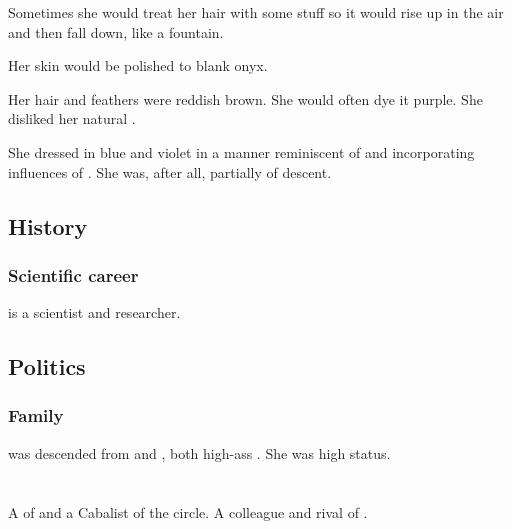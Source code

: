 Sometimes she would treat her hair with some stuff so it would rise up in the air and then fall down, like a fountain. 

Her skin would be polished to blank onyx. 

Her hair and feathers were reddish brown.
She would often dye it purple. 
She disliked her natural \colour. 

She dressed in blue and violet in a manner reminiscent of and incorporating influences of \TiphredSerah. 
She was, after all, partially of \TiphredSerah{} descent. 









\subsection{History}





\subsubsection{Scientific career}
\Firaxel{} is a scientist and researcher. 









\subsection{Politics}
\subsubsection{Family}
\Firaxel{} was descended from  and , both high-ass \ketherain.
She was high status. 















\section{\Ganethed}
\index{\Ganethed}
A \thelyad{} \resphan{} of \CiriathSepher{} and a Cabalist of the \teshrialcircle circle. 
A colleague and rival of \Teshrial. 









